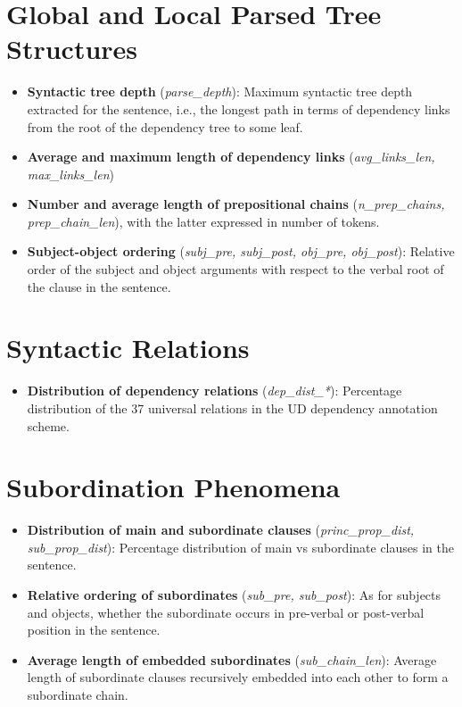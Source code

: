 \documentclass[a4paper, nobind]{templates/ociamthesis}
\providecommand{\tightlist}{%
  \setlength{\itemsep}{0pt}\setlength{\parskip}{0pt}}
\begin{document}
\hypertarget{global-and-local-parsed-tree-structures}{%
\section{Global and Local Parsed Tree Structures}\label{global-and-local-parsed-tree-structures}}

\begin{itemize}
\item
  \textbf{Syntactic tree depth} (\emph{parse\_depth}): Maximum syntactic tree depth extracted for the sentence, i.e., the longest path in terms of dependency links from the root of the dependency tree to some leaf.
\item
  \textbf{Average and maximum length of dependency links} (\emph{avg\_links\_len, max\_links\_len})
\item
  \textbf{Number and average length of prepositional chains} (\emph{n\_prep\_chains, prep\_chain\_len}), with the latter expressed in number of tokens.
\item
  \textbf{Subject-object ordering} (\emph{subj\_pre, subj\_post, obj\_pre, obj\_post}): Relative order of the subject and object arguments with respect to the verbal root of the clause in the sentence.
\end{itemize}

\hypertarget{syntactic-relations}{%
\section{Syntactic Relations}\label{syntactic-relations}}

\begin{itemize}
\tightlist
\item
  \textbf{Distribution of dependency relations} (\emph{dep\_dist\_*}): Percentage distribution of the 37 universal relations in the UD dependency annotation scheme.
\end{itemize}

\hypertarget{subordination-phenomena}{%
\section{Subordination Phenomena}\label{subordination-phenomena}}

\begin{itemize}
\item
  \textbf{Distribution of main and subordinate clauses} (\emph{princ\_prop\_dist, sub\_prop\_dist}): Percentage distribution of main vs subordinate clauses in the sentence.
\item
  \textbf{Relative ordering of subordinates} (\emph{sub\_pre, sub\_post}): As for subjects and objects, whether the subordinate occurs in pre-verbal or post-verbal position in the sentence.
\item
  \textbf{Average length of embedded subordinates} (\emph{sub\_chain\_len}): Average length of subordinate clauses recursively embedded into each other to form a subordinate chain.
\end{itemize}
\end{document}

